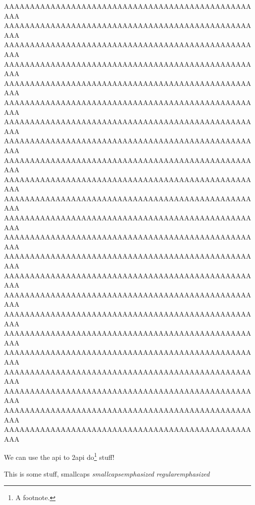 \documentclass[final,11pt,baselinegrid]{../../uit-thesis}
\begin{document}
AAAAAAAAAAAAAAAAAAAAAAAAAAAAAAAAAAAAAAAAAAAAAAAAAAA\newline
%
AAAAAAAAAAAAAAAAAAAAAAAAAAAAAAAAAAAAAAAAAAAAAAAAAAA\newline
AAAAAAAAAAAAAAAAAAAAAAAAAAAAAAAAAAAAAAAAAAAAAAAAAAA\newline
AAAAAAAAAAAAAAAAAAAAAAAAAAAAAAAAAAAAAAAAAAAAAAAAAAA\newline
AAAAAAAAAAAAAAAAAAAAAAAAAAAAAAAAAAAAAAAAAAAAAAAAAAA\newline
AAAAAAAAAAAAAAAAAAAAAAAAAAAAAAAAAAAAAAAAAAAAAAAAAAA\newline
AAAAAAAAAAAAAAAAAAAAAAAAAAAAAAAAAAAAAAAAAAAAAAAAAAA\newline
AAAAAAAAAAAAAAAAAAAAAAAAAAAAAAAAAAAAAAAAAAAAAAAAAAA\newline
AAAAAAAAAAAAAAAAAAAAAAAAAAAAAAAAAAAAAAAAAAAAAAAAAAA\newline
AAAAAAAAAAAAAAAAAAAAAAAAAAAAAAAAAAAAAAAAAAAAAAAAAAA\newline
AAAAAAAAAAAAAAAAAAAAAAAAAAAAAAAAAAAAAAAAAAAAAAAAAAA\newline
AAAAAAAAAAAAAAAAAAAAAAAAAAAAAAAAAAAAAAAAAAAAAAAAAAA\newline
AAAAAAAAAAAAAAAAAAAAAAAAAAAAAAAAAAAAAAAAAAAAAAAAAAA\newline
AAAAAAAAAAAAAAAAAAAAAAAAAAAAAAAAAAAAAAAAAAAAAAAAAAA\newline
AAAAAAAAAAAAAAAAAAAAAAAAAAAAAAAAAAAAAAAAAAAAAAAAAAA\newline
AAAAAAAAAAAAAAAAAAAAAAAAAAAAAAAAAAAAAAAAAAAAAAAAAAA\newline
AAAAAAAAAAAAAAAAAAAAAAAAAAAAAAAAAAAAAAAAAAAAAAAAAAA\newline
AAAAAAAAAAAAAAAAAAAAAAAAAAAAAAAAAAAAAAAAAAAAAAAAAAA\newline
AAAAAAAAAAAAAAAAAAAAAAAAAAAAAAAAAAAAAAAAAAAAAAAAAAA\newline
AAAAAAAAAAAAAAAAAAAAAAAAAAAAAAAAAAAAAAAAAAAAAAAAAAA\newline
AAAAAAAAAAAAAAAAAAAAAAAAAAAAAAAAAAAAAAAAAAAAAAAAAAA\newline
AAAAAAAAAAAAAAAAAAAAAAAAAAAAAAAAAAAAAAAAAAAAAAAAAAA\newline
AAAAAAAAAAAAAAAAAAAAAAAAAAAAAAAAAAAAAAAAAAAAAAAAAAA\newline
\lipsum[1]
\lipsum[1]
\lipsum[1-7]



We can use the \ac{api} to \ac{2api} do\footnote{A footnote.} stuff!

This is some stuff, {\sc smallcaps {\em smallcapsemphasized}} {\em
regularemphasized}
\end{document}
